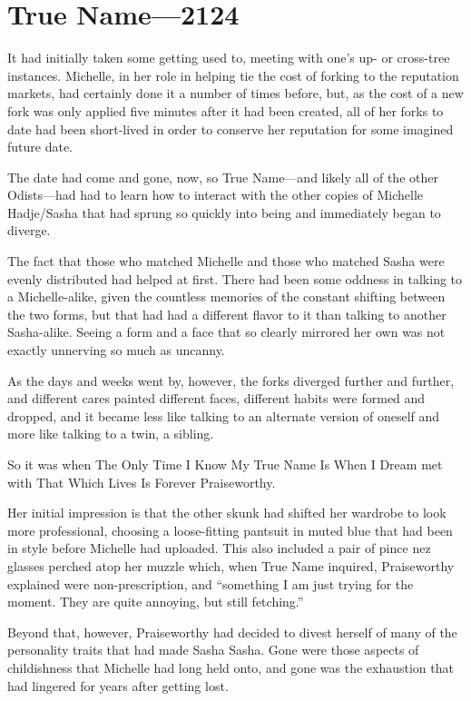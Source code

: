 \hypertarget{true-name-2124}{%
\chapter{True Name---2124}\label{true-name-2124}}

It had initially taken some getting used to, meeting with one's up- or cross-tree instances. Michelle, in her role in helping tie the cost of forking to the reputation markets, had certainly done it a number of times before, but, as the cost of a new fork was only applied five minutes after it had been created, all of her forks to date had been short-lived in order to conserve her reputation for some imagined future date.

The date had come and gone, now, so True Name---and likely all of the other Odists---had had to learn how to interact with the other copies of Michelle Hadje/Sasha that had sprung so quickly into being and immediately began to diverge.

The fact that those who matched Michelle and those who matched Sasha were evenly distributed had helped at first. There had been some oddness in talking to a Michelle-alike, given the countless memories of the constant shifting between the two forms, but that had had a different flavor to it than talking to another Sasha-alike. Seeing a form and a face that so clearly mirrored her own was not exactly unnerving so much as uncanny.

As the days and weeks went by, however, the forks diverged further and further, and different cares painted different faces, different habits were formed and dropped, and it became less like talking to an alternate version of oneself and more like talking to a twin, a sibling.

So it was when The Only Time I Know My True Name Is When I Dream met with That Which Lives Is Forever Praiseworthy.

Her initial impression is that the other skunk had shifted her wardrobe to look more professional, choosing a loose-fitting pantsuit in muted blue that had been in style before Michelle had uploaded. This also included a pair of pince nez glasses perched atop her muzzle which, when True Name inquired, Praiseworthy explained were non-prescription, and ``something I am just trying for the moment. They are quite annoying, but still fetching.''

Beyond that, however, Praiseworthy had decided to divest herself of many of the personality traits that had made Sasha Sasha. Gone were those aspects of childishness that Michelle had long held onto, and gone was the exhaustion that had lingered for years after getting lost.

